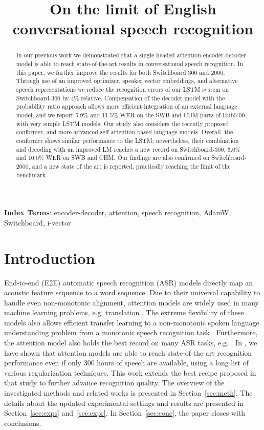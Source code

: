 \documentclass[a4paper]{article}
\title{\vspace{-1mm}On the limit of English conversational speech recognition}
\begin{document}
\ninept

\renewcommand{\baselinestretch}{0.938}\normalsize
\newcommand{\argmax}{\operatornamewithlimits{argmax}}
\maketitle


\begin{abstract}
\vspace{-1mm}
In our previous work we demonstrated that a single headed attention encoder-decoder model is able to reach state-of-the-art results in conversational speech recognition.
In this paper, we further improve the results for both Switchboard 300 and 2000.
Through use of an improved optimizer, speaker vector embeddings, and alternative speech representations we reduce the recognition errors of our LSTM system on Switchboard-300 by 4\% relative.
Compensation of the decoder model with the probability ratio approach allows more efficient integration of an external language model, and we report 5.9\% and 11.5\% WER on the SWB and CHM parts of Hub5'00 with very simple LSTM models.
Our study also considers the recently proposed conformer, and more advanced self-attention based language models.
Overall, the conformer shows similar performance to the LSTM; nevertheless, their combination and decoding with an improved LM reaches a new record on Switchboard-300, 5.0\% and 10.0\% WER on SWB and CHM.
Our findings are also confirmed on Switchboard-2000, and a new state of the art is reported, practically reaching the limit of the benchmark.
\end{abstract}
\noindent\textbf{Index Terms}: encoder-decoder, attention, speech recognition, AdamW, Switchboard, i-vector


\vspace{-.25mm}
\section{Introduction}
\vspace{-.5mm}
\label{sec:intro}
End-to-end (E2E) automatic speech recognition (ASR) models directly map an acoustic feature sequence to a word sequence.
Due to their universal capability to handle even non-monotonic alignment, attention models are widely used in many machine learning problems, e.g. translation \cite{Bahdanau2015}.
The extreme flexibility of these models also allows efficient transfer learning to a non-monotonic spoken language understanding problem from a monotonic speech recognition task \cite{Kuo2020}.
Furthermore, the attention model also holds the best record on many ASR tasks, e.g. \cite{Gulati2020}.
In \cite{Tuske2020}, we have shown that attention models are able to reach state-of-the-art recognition performance even if only 300 hours of speech are available, using a long list of various regularization techniques.
This work extends the best recipe proposed in that study to further advance recognition quality.
The overview of the investigated methods and related works is presented in Section~\ref{sec:meth}.
The details about the updated experimental settings and results are presented in Section~\ref{sec:exps} and~\ref{sec:expr}.
In Section~\ref{sec:conc}, the paper closes with conclusions.
\end{document}

